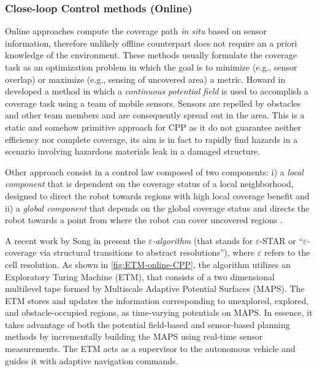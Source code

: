 \subsubsection{Close-loop Control methods (Online)} %
\label{ssub:close_loop_control_method}
Online approaches compute the coverage path \textit{in situ} based on sensor information, therefore unlikely offline counterpart does not require an a priori knowledge of the environment. These methods usually formulate the coverage task as an optimization problem in which the goal is to minimize (e.g., sensor overlap) or maximize (e.g., sensing of uncovered area) a metric. Howard in \cite{PotFieldCPP} developed a method in which a \textit{continuous potential field} is used to accomplish a coverage task using a team of mobile sensors. Sensors are repelled by obstacles and other team members and are consequently spread out in the area. This is a static and somehow primitive approach for CPP as it do not guarantee neither efficiency nor complete coverage, its aim is in fact to rapidly find hazards in a scenario involving hazardous materials leak in a damaged structure.\par
Other approach consist in a control law composed of two components: i) a \textit{local component} that is dependent on the coverage status of a local neighborhood, designed to direct the robot towards regions with high local coverage benefit and ii) a \textit{global component} that depends on the global coverage status and directs the robot towards a point from where the robot can cover uncovered regions \cite{6385558}.\par
A recent work by Song in \cite{8286947} present the \textit{$\varepsilon$-algorithm} (that stands for $\varepsilon$-STAR or “$\varepsilon$-coverage via structural transitions to abstract resolutions”), where $\varepsilon$ refers to the cell resolution. As shown in \autoref{fig:ETM-online-CPP}, the algorithm utilizes an Exploratory Turing Machine (ETM), that consists of a two dimensional multilevel tape formed by Multiscale Adaptive Potential Surfaces (MAPS). The ETM stores and updates the information corresponding to unexplored, explored, and obstacle-occupied regions, as time-varying potentials on MAPS. In essence, it takes advantage of both the potential field-based and sensor-based planning methods by incrementally building the MAPS using real-time sensor measurements. The ETM acts as a supervisor to the autonomous vehicle and guides it with adaptive navigation commands.
